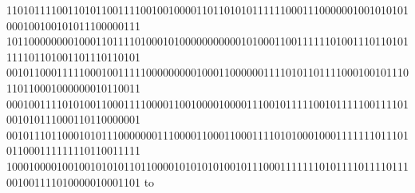 \documentclass[10pt,\tflang,pdftex]{book}
\begin{document}
{{\begin{minipage}{\oldpwidth}
{{{{110101111001101011001111001001000011011010101111110001110000001001010101000100100101011100000111\\
101100000000100011011110100010100000000000101000110011111101001110110101111101101001101110110101\\
001011000111110001001111100000000010001100000011110101101111000100101110110110001000000010110011\\
000100111101010011000111100001100100001000011100101111100101111100111101001010111000110110000001\\
001011101100010101110000000111000011000110001111010100010001111111011101011000111111110110011111\\
100010000100100101010110110000101010101001011100011111110101111011110111001001111010000010001101}}}}\fi
\vbox to
\end{minipage}}}
\end{document}
